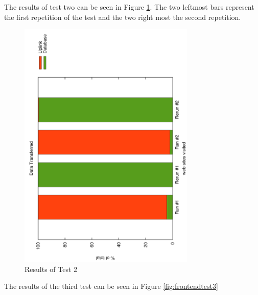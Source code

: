 The results of test two can be seen in Figure \ref{fig:frontendtest2}. The two leftmost bars represent the first repetition of the test and the two right most the second repetition.

\begin{figure}
	\centering
		\includegraphics[width=0.75\textwidth, angle=-90]{./img/rerun.pdf}
    	\caption{Results of Test 2}
	\label{fig:frontendtest2}
\end{figure}

The results of the third test can be seen in Figure \ref{fig:frontendtest3}

